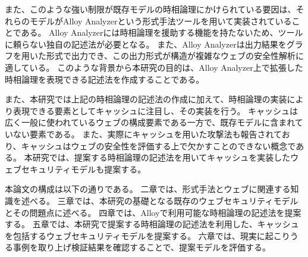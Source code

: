 \documentclass[12pt,a4paper]{jbook}
\begin{document}
また、このような強い制限が既存モデルの時相論理にかけられている要因は、それらのモデルがAlloy Analyzerという形式手法ツールを用いて実装されていることである。
Alloy Analyzerには時相論理を援助する機能を持たないため、ツールに頼らない独自の記述法が必要となる。
また、Alloy Analyzerは出力結果をグラフを用いた形式で出力でき、この出力形式が構造が複雑なウェブの安全性解析に適している。
このような背景から本研究の目的は、Alloy Analyzer上で拡張した時相論理を表現できる記述法を作成することである。

また、本研究では上記の時相論理の記述法の作成に加えて、時相論理の実装により表現できる要素としてキャッシュに注目し、その実装を行う。
キャッシュは広く一般に使われているウェブの構成要素である一方で、既存モデルに含まれていない要素である。
また、実際にキャッシュを用いた攻撃法\cite{bcpattack}も報告されており、キャッシュはウェブの安全性を評価する上で欠かすことのできない概念である。
本研究では、提案する時相論理の記述法を用いてキャッシュを実装したウェブセキュリティモデルも提案する。

本論文の構成は以下の通りである。
二章では、形式手法とウェブに関連する知識を述べる。
三章では、本研究の基礎となる既存のウェブセキュリティモデルとその問題点に述べる。
四章では、Alloyで利用可能な時相論理の記述法を提案する。
五章では、本研究で提案する時相論理の記述法を利用した、キャッシュを包括するウェブセキュリティモデルを提案する。
六章では、現実に起こりうる事例を取り上げ検証結果を確認することで、提案モデルを評価する。
\end{document}
